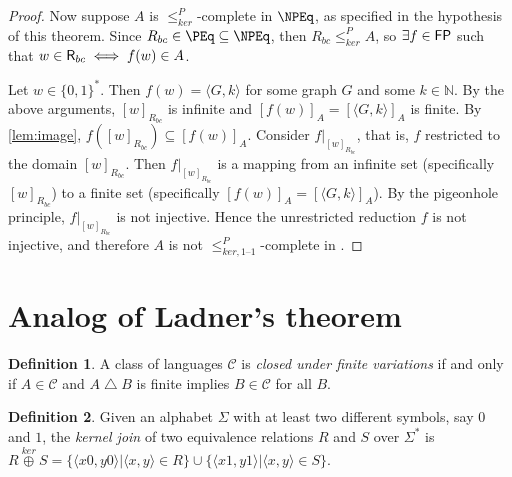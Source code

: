 \documentclass{article}
\theoremstyle{definition} \newtheorem{definition}[definition]{Definition}
\newcommand{\sigmastar}{\{0, 1\}^{*}} %
\newcommand{\kj}{\overset{ker}{\oplus}} %
\newcommand{\kr}{\leq^{P}_{ker}} %
\newcommand{\kri}{\leq^{P}_{ker,1\text{--}1}} %
\newcommand{\symdiff}{\bigtriangleup} %
\newcommand{\defn}[1]{\emph{#1}} %
\newcommand{\pair}[2]{\langle#1,#2\rangle} %
\begin{document}
\begin{proof}
  Now suppose $A$ is $\kr$-complete in $\NPEq$, as specified in the hypothesis
  of this theorem. Since $R_{bc}\in\PEq\subseteq\NPEq$, then $R_{bc}\kr A$, so
  $\exists f\in{\ensuremath{\mathsf{FP}}}$ such that $w\in{\ensuremath{\mathsf{R}}}_{bc}\iff f(w)\in A$.

  Let $w\in\sigmastar$. Then $f(w)=\pair{G}{k}$ for some graph $G$ and some
  $k\in\mathbb{N}$. By the above arguments, $[w]_{R_{bc}}$ is infinite and
  $[f(w)]_A=[\pair{G}{k}]_A$ is finite. By \autoref{lem:image},
  $f([w]_{R_{bc}})\subseteq [f(w)]_A$. Consider $f|_{[w]_{R_{bc}}}$, that is,
  $f$ restricted to the domain $[w]_{R_{bc}}$. Then $f|_{[w]_{R_{bc}}}$ is a
  mapping from an infinite set (specifically $[w]_{R_{bc}}$) to a finite set
  (specifically $[f(w)]_A=[\pair{G}{k}]_A$). By the pigeonhole principle,
  $f|_{[w]_{R_{bc}}}$ is not injective. Hence the unrestricted reduction $f$ is
  not injective, and therefore $A$ is not $\kri$-complete in \NPEq.
\end{proof}

\section{Analog of Ladner's theorem}

\begin{definition}
  A class of languages $\mathcal{C}$ is \defn{closed under finite variations}
  if and only if $A\in \mathcal{C}$ and $A\symdiff B$ is finite implies $B\in
  \mathcal{C}$ for all $B$.
\end{definition}

\begin{definition}
  Given an alphabet $\Sigma$ with at least two different symbols, say $0$ and
  $1$, the \defn{kernel join} of two equivalence relations $R$ and $S$ over
  $\Sigma^*$ is $R\kj S=\{\pair{x0}{y0}|\pair{x}{y}\in
  R\}\cup\{\pair{x1}{y1}|\pair{x}{y}\in S\}$.
\end{definition}
\end{document}
